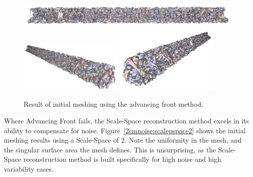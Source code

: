 \documentclass[12pt]{drexelthesis}
\begin{document}
\begin{figure}[!ht]
	\centering
		\includegraphics[width=5in]{simulated-lab-scan/2cmnoise/2cmmeshNeat/advancingfront00.png}
		\includegraphics[width=2in]{simulated-lab-scan/2cmnoise/2cmmeshNeat/advancingfront01.png}
		\includegraphics[width=2in]{simulated-lab-scan/2cmnoise/2cmmeshNeat/advancingfront02.png}
		\caption[Initial meshing using a raw advancing front approach]{\centering  Result of initial meshing using the advancing front method.}
		\label{2cmnoise:advancingfront}
\end{figure}

Where Advancing Front fails, the Scale-Space reconstruction method excels in its ability to compensate for noise. Figure~\ref{2cmnoise:scalepspace2} shows the initial meshing results using a Scale-Space of 2. Note the uniformity in the mesh, and the singular surface area the mesh defines. This is unsurprising, as the Scale-Space reconstruction method is built specifically for high noise and high variability cases.
\end{document}
